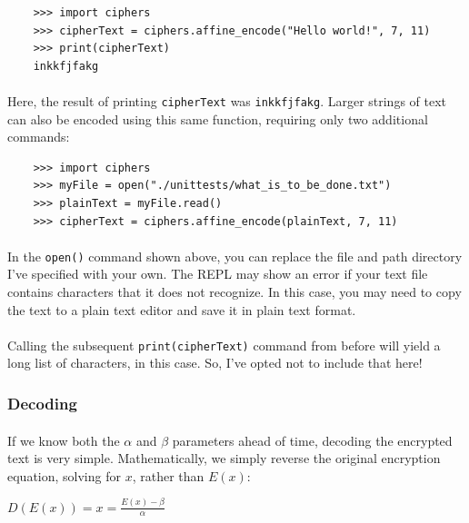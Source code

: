 \documentclass[12pt,a4paper]{article}
\begin{document}
\begin{verbatim}
    >>> import ciphers   
    >>> cipherText = ciphers.affine_encode("Hello world!", 7, 11)
    >>> print(cipherText)
    inkkfjfakg
\end{verbatim}

\paragraph{}
Here, the result of printing \verb|cipherText| was \verb|inkkfjfakg|.  
Larger strings of text can also be encoded using this same function, 
requiring only two additional commands:

\begin{verbatim}
    >>> import ciphers   
    >>> myFile = open("./unittests/what_is_to_be_done.txt")
    >>> plainText = myFile.read()
    >>> cipherText = ciphers.affine_encode(plainText, 7, 11)
\end{verbatim}

\paragraph{}
In the \verb|open()| command shown above, you can replace the file and 
path directory I've specified with your own.  The REPL may show an error if 
your text file contains characters that it does not recognize.  In this case, 
you may need to copy the text to a plain text editor and save it in plain text 
format.

\paragraph{}
Calling the subsequent \verb|print(cipherText)| command from before will 
yield a long list of characters, in this case.  So, I've opted not to include 
that here!

\subsubsection{Decoding}
\paragraph{}
If we know both the $\alpha$ and $\beta$ parameters ahead of time, decoding 
the encrypted text is very simple.  Mathematically, we simply reverse the 
original encryption equation, solving for $x$, rather than $E(x)$:

$D(E(x)) = x = \frac{E(x) - \beta}{\alpha}$
\end{document}
